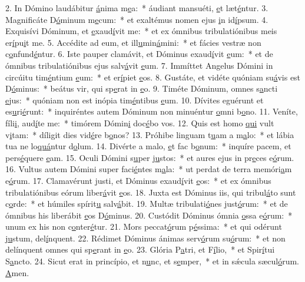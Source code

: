 2. In Dómino laudábitur \uline{á}nima m\uline{e}a:~* áudiant mansuéti, \uline{e}t læt\uline{é}ntur.
3. Magnificáte D\uline{ó}minum m\uline{e}cum:~* et exaltémus nomen ejus \uline{i}n id\uline{í}psum.
4. Exquisívi Dóminum, et \uline{e}xaud\uline{í}vit me:~* et ex ómnibus tribulatiónibus meis er\uline{í}pu\uline{i}t me.
5. Accédite ad eum, et ill\uline{u}min\uline{á}mini:~* et fácies vestræ non c\uline{o}nfund\uline{é}ntur.
6. Iste pauper clamávit, et Dóminus exaud\uline{í}vit \uline{e}um:~* et de ómnibus tribulatiónibus ejus salv\uline{á}vit \uline{e}um.
7. Immíttet Angelus Dómini in circúitu tim\uline{é}ntium \uline{e}um:~* et er\uline{í}piet \uline{e}os.
8. Gustáte, et vidéte quóniam su\uline{á}vis est D\uline{ó}minus:~* beátus vir, qui sp\uline{e}rat in \uline{e}o.
9. Timéte Dóminum, omnes s\uline{a}ncti \uline{e}jus:~* quóniam non est inópia tim\uline{é}ntibus \uline{e}um.
10. Dívites eguérunt et es\uline{u}ri\uline{é}runt:~* inquiréntes autem Dóminum non minuéntur \uline{o}mni b\uline{o}no.
11. Veníte, fíli\uline{i}, aud\uline{í}te me:~* timórem Dómin\uline{i} doc\uline{é}bo vos.
12. Quis est homo \uline{qui} vult v\uline{i}tam:~* díligit dies vid\uline{é}re b\uline{o}nos?
13. Próhibe linguam t\uline{u}am a m\uline{a}lo:~* et lábia tua ne lo\uline{quá}ntur d\uline{o}lum.
14. Divérte a malo, \uline{e}t fac b\uline{o}num:~* inquíre pacem, et pers\uline{é}quere \uline{e}am.
15. Oculi Dómini s\uline{u}per j\uline{u}stos:~* et aures ejus in pr\uline{e}ces e\uline{ó}rum.
16. Vultus autem Dómini super faci\uline{é}ntes m\uline{a}la:~* ut perdat de terra memóri\uline{a}m e\uline{ó}rum.
17. Clamavérunt justi, et Dóminus exaud\uline{í}vit \uline{e}os:~* et ex ómnibus tribulatiónibus eórum liber\uline{á}vit \uline{e}os.
18. Juxta est Dóminus iis, qui tribul\uline{á}to sunt c\uline{o}rde:~* et húmiles spírit\uline{u} salv\uline{á}bit.
19. Multæ tribulati\uline{ó}nes just\uline{ó}rum:~* et de ómnibus his liberábit \uline{e}os D\uline{ó}minus.
20. Custódit Dóminus ómnia \uline{o}ssa e\uline{ó}rum:~* unum ex his non c\uline{o}nter\uline{é}tur.
21. Mors peccat\uline{ó}rum p\uline{é}ssima:~* et qui odérunt j\uline{u}stum, del\uline{í}nquent.
22. Rédimet Dóminus ánimas serv\uline{ó}rum su\uline{ó}rum:~* et non delínquent omnes qui sp\uline{e}rant in \uline{e}o.
23. Glória P\uline{a}tri, et F\uline{í}lio,~* et Spir\uline{í}tui S\uline{a}ncto.
24. Sicut erat in princípio, et n\uline{u}nc, et s\uline{e}mper,~* et in sǽcula sæcul\uline{ó}rum. \uline{A}men.
